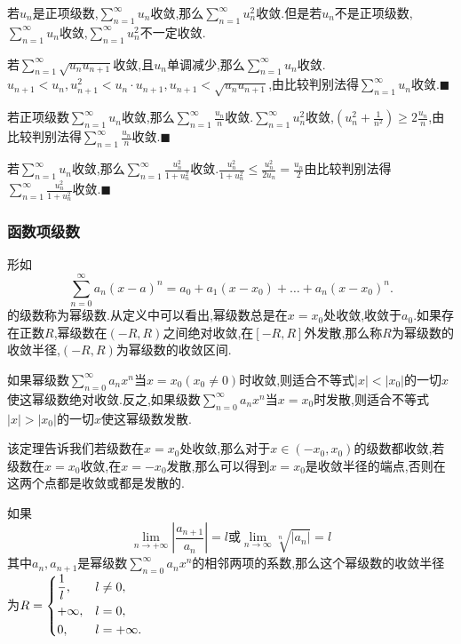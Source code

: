 \begin{theorem}[级数收敛的几个特例]
    若$u_n$是正项级数,$\sum_{n=1}^{\infty} u_n$收敛,那么$\sum_{n=1}^{\infty} u_n^2$收敛.但是若$u_n$不是正项级数,$\sum_{n=1}^{\infty} u_n$收敛,$\sum_{n=1}^{\infty} u_n^2$不一定收敛.

    若$\sum_{n=1}^{\infty} \sqrt{u_nu_{n+1}}$收敛,且$u_n$单调减少,那么$\sum_{n=1}^{\infty} u_n$收敛.\zheng $u_{n+1}<u_n,u_{n+1}^2<u_n\cdot u_{n+1},u_{n+1}<\sqrt{u_nu_{n+1}}$,由比较判别法得$\sum_{n=1}^{\infty} u_n$收敛.\hfill $\blacksquare $

    若正项级数$\sum_{n=1}^{\infty} u_n$收敛,那么$\sum_{n=1}^{\infty} \frac{u_n}{n}$收敛.\zheng $\sum_{n=1}^{\infty} u_n^2$收敛,$\left(u_n^2+\frac{1}{n^2}\right) \geqslant 2\frac{u_n}{n}$,由比较判别法得$\sum_{n=1}^{\infty} \frac{u_n}{n}$收敛.\hfill $\blacksquare $

    若$\sum_{n=1}^{\infty} u_n$收敛,那么$\sum_{n=1}^{\infty} \frac{u_n^2}{1+u_n^2}$收敛.\zheng $\frac{u_n^2}{1+u_n^2}\leqslant \frac{u_n^2}{2u_n}=\frac{u_n}{2}$由比较判别法得$\sum_{n=1}^{\infty} \frac{u_n^2}{1+u_n^2}$收敛.\hfill $\blacksquare $

\end{theorem}
\subsubsection{函数项级数}
形如
    \begin{equation*}
        \sum^{\infty}_{n=0}a_n(x-a)^n=a_0+a_1(x-x_0)+\dots+a_n(x-x_0)^n.
    \end{equation*}
的级数称为幂级数.从定义中可以看出,幂级数总是在$x=x_0$处收敛,收敛于$a_0$.如果存在正数$R$,幂级数在$(-R,R)$之间绝对收敛,在$[-R,R]$外发散,那么称$R$为幂级数的收敛半径,$(-R,R)$为幂级数的收敛区间.

\begin{ttheorem}[（Abel定理）]
    如果幂级数$\sum_{n=0}^{\infty} a_nx^n$当$x=x_0(x_0 \neq 0)$时收敛,则适合不等式$\left\lvert x\right\rvert <\left\lvert x_0\right\rvert $的一切$x$使这幂级数绝对收敛.反之,如果级数$\sum_{n=0}^{\infty} a_nx^n$当$x=x_0$时发散,则适合不等式$\left\lvert x\right\rvert >\left\lvert x_0\right\rvert $的一切$x$使这幂级数发散.
\end{ttheorem}
该定理告诉我们若级数在$x=x_0$处收敛,那么对于$x \in (-x_0,x_0)$的级数都收敛,若级数在$x=x_0$收敛,在$x=-x_0$发散,那么可以得到$x=x_0$是收敛半径的端点,否则在这两个点都是收敛或都是发散的.

\begin{ttheorem}[（幂级数的收敛半径）]
    如果
    \begin{equation*}
        \lim_{n \to +\infty} \left\lvert \frac{a_{n+1}}{a_n}\right\rvert =l\text{或}\lim_{n \to \infty} \sqrt[n]{\left\lvert a_n\right\rvert }=l
    \end{equation*}
    其中$a_n,a_{n+1}$是幂级数$\sum_{n=0}^{\infty} a_nx^n$的相邻两项的系数,那么这个幂级数的收敛半径为$R=
    \begin{dcases}
        \frac{1}{l},&l\neq 0,\\
        +\infty,&l= 0,\\
        0,&l= +\infty.
    \end{dcases}
    $
\end{ttheorem}

